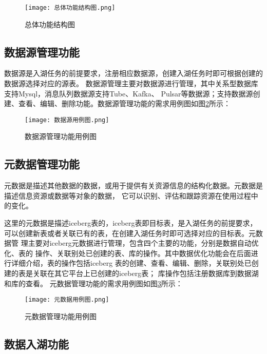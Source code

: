\begin{figure}[H]
  \centering
  \texttt{[image: 总体功能结构图.png]}
  \caption{总体功能结构图}
  \label{fig:总体功能结构图}
\end{figure}

\subsection{数据源管理功能}

数据源是入湖任务的前提要求，注册相应数据源，创建入湖任务时即可根据创建的数据源选择对应的源表。
数据源管理主要对数据源进行管理，其中关系型数据库支持Mysql，消息队列数据源支持Tube、Kafka、
Pulsar等数据源；支持数据源创建、查看、编辑、删除功能。数据源管理功能的需求用例图如图\ref{fig:数据源用例图}所示：

\begin{figure}[H]
  \centering
  \texttt{[image: 数据源用例图.png]}
  \caption{数据源管理功能用例图}
  \label{fig:数据源用例图}
\end{figure}

\subsection{元数据管理功能}

元数据是描述其他数据的数据，或用于提供有关资源信息的结构化数据。元数据是描述信息资源或数据等对象的数据，
它可以识别、评估和跟踪资源在使用过程中的变化\cite{15}。

这里的元数据是描述iceberg表的，iceberg表即目标表，是入湖任务的前提要求，
可以创建新表或者关联已有的表，在创建入湖任务时即可选择对应的目标表。元数据管
理主要对iceberg元数据进行管理，包含四个主要的功能，分别是数据自动优化、表的
操作、关联别处已创建的表、库的操作。其中数据优化功能会在后面进行详细介绍，表的操作包括iceberg
表的创建、查看、编辑、删除，关联别处已创建的表是关联在其它平台上已创建的iceberg表；
库操作包括注册数据库到数据湖和库的查看。
元数据管理功能的需求用例图如图\ref{fig:元数据用例图}所示：

\begin{figure}[H]
  \centering
  \texttt{[image: 元数据用例图.png]}
  \caption{元数据管理功能用例图}
  \label{fig:元数据用例图}
\end{figure}

\subsection{数据入湖功能}

